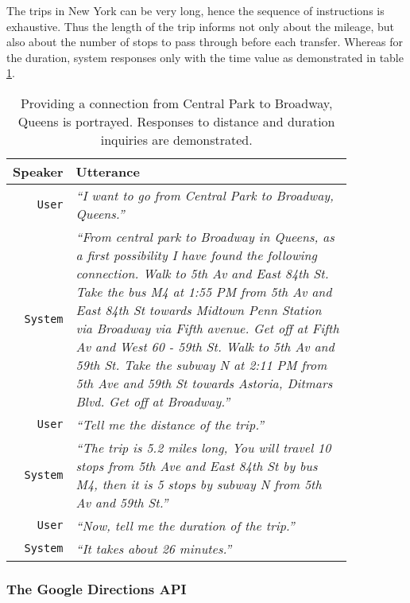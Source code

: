 The trips in New York can be very long, hence the sequence of instructions is exhaustive.
Thus the length of the trip informs not only about the mileage, but also about the number of stops to pass through before each transfer.
Whereas for the duration, system responses only with the time value as demonstrated in table \ref{table:distance}.

\begin{table}[h]
\centering
\begin{tabular}{ | r | p{0.85\linewidth} | } \hline
	\textbf{Speaker} & \textbf{Utterance} \\ \hline
	\texttt{User} & \textit{``I want to go from Central Park to Broadway, Queens.''} \\ \hline
	\texttt{System} & \textit{``From central park to Broadway in Queens, as a first possibility
	I have found the following connection.
	Walk to 5th Av and East 84th St. 
	Take the bus M4 at 1:55 PM from 5th Av and East 84th St towards Midtown Penn Station via Broadway via Fifth avenue.
	Get off at Fifth Av and West 60 - 59th St. Walk to 5th Av and 59th St.
	Take the subway N at 2:11 PM from 5th Ave and 59th St towards Astoria, Ditmars Blvd. 
	Get off at Broadway.''} \\ \hline
	\texttt{User} & \textit{``Tell me the distance of the trip.''} \\ \hline
	\texttt{System} & \textit{``The trip is 5.2 miles long, You will travel 10 stops from 5th Ave and East 84th St by bus M4, then it is 5 stops by subway N from 5th Av and 59th St.''} \\ \hline
	\texttt{User} & \textit{``Now, tell me the duration of the trip.''} \\ \hline
	\texttt{System} & \textit{``It takes about 26 minutes.''} \\ \hline
\end{tabular}
\caption[Particular connection with distance and duration inquiries]{Providing a connection from Central Park to Broadway, Queens is portrayed. Responses to distance and duration inquiries are demonstrated.}
\label{table:distance}
\end{table}

\subsubsection{The Google Directions API}

